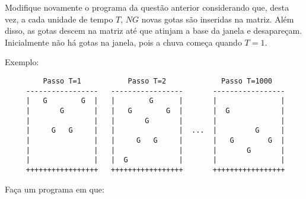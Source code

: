 \item Modifique novamente o programa da questão anterior considerando que,
desta vez, a 
cada unidade de tempo $T$, $NG$ novas gotas são inseridas na matriz. Além
disso, as gotas descem na matriz até que atinjam a base da janela e desapareçam.
Inicialmente não há gotas na janela, pois a chuva começa quando $T=1$.

\vspace*{0.3cm}
Exemplo:
\begin{small}
\begin{verbatim}
         Passo T=1           Passo T=2             Passo T=1000
     -----------------   -----------------       ----------------- 
     |   G        G  |   |        G      |       |               |
     |       G       |   |   G        G  |       |  G            |
     |               |   |       G       |       |               |
     |     G   G     |   |               |  ...  |         G     |
     |               |   |     G   G     |       |   G        G  |
     |               |   |               |       |       G       |
     |               |   |  G            |       |               |
     +++++++++++++++++   +++++++++++++++++       +++++++++++++++++
\end{verbatim}
\end{small}

Faça um programa em  que:

